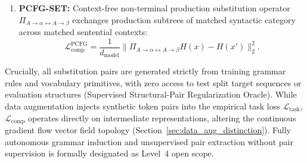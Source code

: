 \documentclass{article}
\theoremstyle{plain}
\theoremstyle{definition}
\begin{document}
\begin{enumerate}[leftmargin=*,noitemsep]
    \begin{equation}
        \mathcal{L}_{\text{comp}}^{\text{COGS}} = \frac{1}{d_{\text{model}}} \| \Pi_{\text{agent}\leftrightarrow\text{theme}} H(x) - H(x') \|_2^2.
    \end{equation}
    \item \textbf{PCFG-SET:} Context-free non-terminal production substitution operator $\Pi_{A \to \alpha \leftrightarrow A \to \beta}$ exchanges production subtrees of matched syntactic category across matched sentential contexts:
    \begin{equation}
        \mathcal{L}_{\text{comp}}^{\text{PCFG}} = \frac{1}{d_{\text{model}}} \| \Pi_{A \to \alpha \leftrightarrow A \to \beta} H(x) - H(x') \|_2^2.
    \end{equation}
\end{enumerate}
Crucially, all substitution pairs are generated strictly from training grammar rules and vocabulary primitives, with zero access to test split target sequences or evaluation structures (Supervised Structural-Pair Regularization Oracle). While data augmentation injects synthetic token pairs into the empirical task loss $\mathcal{L}_{\text{task}}$, $\mathcal{L}_{\text{comp}}$ operates directly on intermediate representations, altering the continuous gradient flow vector field topology (Section~\ref{sec:data_aug_distinction}). Fully autonomous grammar induction and unsupervised pair extraction without pair supervision is formally designated as Level~4 open scope.
\end{document}
